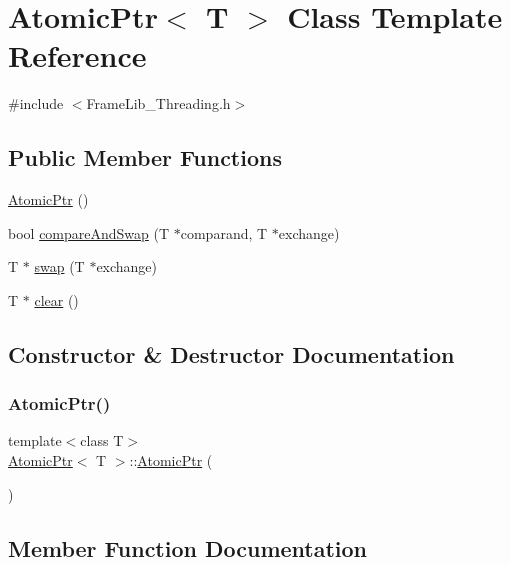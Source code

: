 \hypertarget{class_atomic_ptr}{}\section{Atomic\+Ptr$<$ T $>$ Class Template Reference}
\label{class_atomic_ptr}


{\ttfamily \#include $<$Frame\+Lib\+\_\+\+Threading.\+h$>$}

\subsection*{Public Member Functions}
\begin{DoxyCompactItemize}
\item 
\hyperlink{class_atomic_ptr_a5928e4738a0e9c3a26d166977287b172}{Atomic\+Ptr} ()
\item 
bool \hyperlink{class_atomic_ptr_a553945e2bd92ac404262a6e9f2c31590}{compare\+And\+Swap} (T $\ast$comparand, T $\ast$exchange)
\item 
T $\ast$ \hyperlink{class_atomic_ptr_a45b46112ae64d355062bf823e19f0f5c}{swap} (T $\ast$exchange)
\item 
T $\ast$ \hyperlink{class_atomic_ptr_aa5b96f75a6f1427e28aa7fad94965818}{clear} ()
\end{DoxyCompactItemize}


\subsection{Constructor \& Destructor Documentation}
\mbox{\label{class_atomic_ptr_a5928e4738a0e9c3a26d166977287b172}} 
\subsubsection{\texorpdfstring{Atomic\+Ptr()}{AtomicPtr()}}
{\footnotesize\ttfamily template$<$class T$>$ \\
\hyperlink{class_atomic_ptr}{Atomic\+Ptr}$<$ T $>$\+::\hyperlink{class_atomic_ptr}{Atomic\+Ptr} (\begin{DoxyParamCaption}{ }\end{DoxyParamCaption})\hspace{0.3cm}{\ttfamily [inline]}}



\subsection{Member Function Documentation}
\mbox{\label{class_atomic_ptr_aa5b96f75a6f1427e28aa7fad94965818}} 
